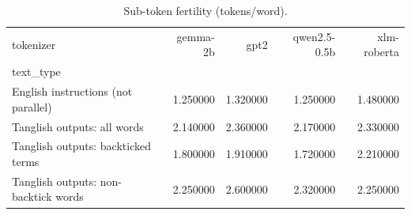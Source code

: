 \begin{table}
\caption{Sub-token fertility (tokens/word).}
\label{tab:fertility}
\begin{tabular}{lrrrr}
\toprule
tokenizer & gemma-2b & gpt2 & qwen2.5-0.5b & xlm-roberta \\
text_type &  &  &  &  \\
\midrule
English instructions (not parallel) & 1.250000 & 1.320000 & 1.250000 & 1.480000 \\
Tanglish outputs: all words & 2.140000 & 2.360000 & 2.170000 & 2.330000 \\
Tanglish outputs: backticked terms & 1.800000 & 1.910000 & 1.720000 & 2.210000 \\
Tanglish outputs: non-backtick words & 2.250000 & 2.600000 & 2.320000 & 2.250000 \\
\bottomrule
\end{tabular}
\end{table}
